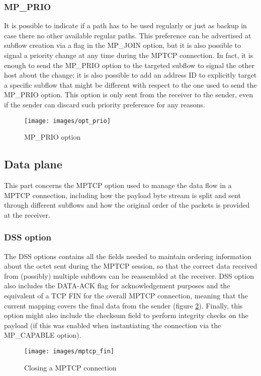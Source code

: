 \subsubsection{MP\_PRIO}
It is possible to indicate if a path has to be used regularly or just as backup in case there no other available regular paths. This preference can be advertised at subflow creation via a flag in the MP\_JOIN option, but it is also possible to signal a priority change at any time during the MPTCP connection. In fact, it is enough to send the MP\_PRIO option to the targeted subflow to signal the other host about the change; it is also possible to add an address ID to explicitly target a specific subflow that might be different with respect to the one used to send the MP\_PRIO option. This option is only sent from the receiver to the sender, even if the sender can discard such priority preference for any reasons. 

\begin{figure}[!htb]
\centering
\texttt{[image: images/opt\_prio]}
\caption{MP\_PRIO option}
\label{fig:opt_prio}
\end{figure}

\subsection{Data plane}
\label{dataplane}
This part concerns the MPTCP option used to manage the data flow in a MPTCP connection, including how the payload byte stream is split and sent through different subflows and how the original order of the packets is provided at the receiver.

\subsubsection{DSS option}
\label{dss}
The DSS options contains all the fields needed to maintain ordering information about the octet sent during the MPTCP session, so that the correct data received from (possibly) multiple subflows can be reassembled at the receiver. DSS option also includes the DATA-ACK flag for acknowledgement purposes and the equivalent of a TCP FIN for the overall MPTCP connection, meaning that the current mapping covers the final data from the sender (figure \ref{fig:mptcp_fin}). Finally, this option might also include the checksum field to perform integrity checks on the payload (if this was enabled when instantiating the connection via the MP\_CAPABLE option).

\begin{figure}[!htb]
\centering
\texttt{[image: images/mptcp\_fin]}
\caption{Closing a MPTCP connection}
\label{fig:mptcp_fin}
\end{figure}


